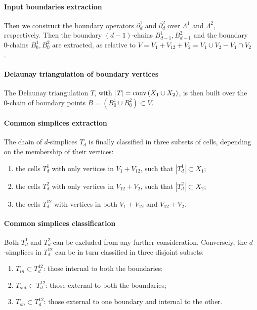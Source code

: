 \documentclass[11pt,oneside]{article}	%
\def\conv{\mbox{\textrm{conv}\,}}
\def\conv{\mbox{\rm conv}\,}
\begin{document}
\paragraph{Input boundaries extraction}
Then we construct the boundary operators $\partial_d^1$ and $\partial_d^2$ over $\Lambda^1$ and $\Lambda^2$, respectively.
Then the boundary $(d-1)$-chains $B_{d-1}^1,B_{d-1}^2$ and the boundary $0$-chains $B_{0}^1,B_{0}^2$ are extracted, as relative to $V = V_{1} + V_{12} + V_{2} = V_{1} \cup V_{2} - V_{1} \cap V_{2}$.

\paragraph{Delaunay triangulation of boundary vertices}
The Delaunay triangulation $T$, with $|T| = \conv (X_1 \cup X_2)$, is then built over the 0-chain of boundary points $B = (B_{0}^1 \cup B_{0}^2) \subset V$.

\paragraph{Common simplices extraction}
The chain of $d$-simplices $T_d$ is finally classified in three subsets of cells, depending on the membership of their vertices:
\begin{enumerate}
\item the cells $T_d^1$ with only vertices in $V_{1} + V_{12}$, such that $|T_d^1|\subset X_1$;
\item the cells $T_d^2$ with only vertices in $V_{12} + V_{2}$, such that $|T_d^2|\subset X_2$;
\item the cells $T_d^{12}$ with vertices in both $V_{1}+V_{12}$ and $V_{12}+V_{2}$.
\end{enumerate}

\paragraph{Common simplices classification}
Both $T_d^1$ and $T_d^2$ can be excluded from any further consideration. Conversely, the $d$-simplices in $T_d^{12}$ can be in turn classified in three disjoint subsets: 
\begin{enumerate}
\item $T_{{in}}\subset T_d^{12}$: those internal to both the boundaries;
\item $T_{{out}}\subset T_d^{12}$: those external to both the boundaries;
\item $T_{{on}}\subset T_d^{12}$: those external to one boundary and internal to the other.
\end{enumerate}
\end{document}
